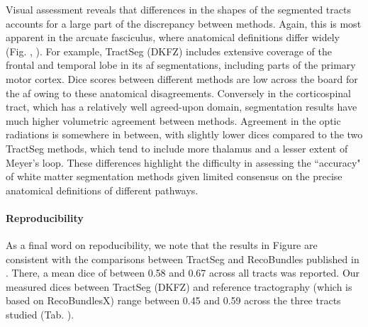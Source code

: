 Visual assessment reveals that  differences in the shapes of the segmented tracts accounts for a large part of the discrepancy between methods.
Again, this is most apparent in the arcuate fasciculus, where anatomical definitions differ widely (Fig. , ).
For example, TractSeg (DKFZ) includes extensive coverage of the frontal and temporal lobe in its \gls{af} segmentations, including parts of the primary motor cortex.
Dice scores between different methods are low across the board for the \gls{af} owing to these anatomical disagreements.
Conversely in the corticospinal tract, which has a relatively well agreed-upon domain, segmentation results have much higher volumetric agreement between methods. 
Agreement in the optic radiations is somewhere in between, with slightly lower \glspl{dice} compared to the two TractSeg methods, which tend to include more thalamus and a lesser extent of Meyer's loop.
These differences highlight the difficulty in assessing the ``accuracy" of white matter segmentation methods given limited consensus on the precise anatomical definitions of different pathways.


\paragraph*{Reproducibility}

As a final word on repoducibility, we note that the results in Figure  are consistent with the comparisons between TractSeg and RecoBundles published in \textcite{Wasserthal2018}.
There, a mean \gls{dice} of between 0.58 and 0.67 across all tracts was reported.
Our measured \gls{dice}s between TractSeg (DKFZ) and reference tractography (which is based on RecoBundlesX\autocite{Garyfallidis2018}) range between 0.45 and 0.59 across the three tracts studied (Tab. ).

